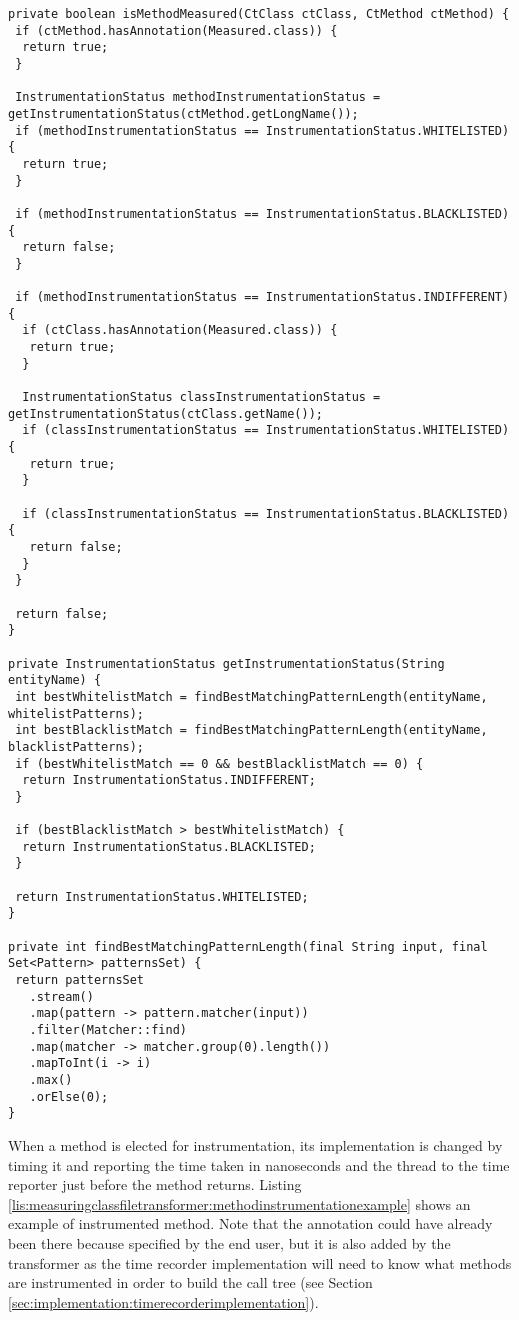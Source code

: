 \begin{lstlisting}[breaklines,caption={$MeasuringClassFileTransformer.isMethodMeasured$ implementation},label=lis:measuringclassfiletransformer:ismethodmeasured]
private boolean isMethodMeasured(CtClass ctClass, CtMethod ctMethod) {
 if (ctMethod.hasAnnotation(Measured.class)) {
  return true;
 }

 InstrumentationStatus methodInstrumentationStatus = getInstrumentationStatus(ctMethod.getLongName());
 if (methodInstrumentationStatus == InstrumentationStatus.WHITELISTED) {
  return true;
 }

 if (methodInstrumentationStatus == InstrumentationStatus.BLACKLISTED) {
  return false;
 }

 if (methodInstrumentationStatus == InstrumentationStatus.INDIFFERENT) {
  if (ctClass.hasAnnotation(Measured.class)) {
   return true;
  }

  InstrumentationStatus classInstrumentationStatus = getInstrumentationStatus(ctClass.getName());
  if (classInstrumentationStatus == InstrumentationStatus.WHITELISTED) {
   return true;
  }

  if (classInstrumentationStatus == InstrumentationStatus.BLACKLISTED) {
   return false;
  }
 }
    
 return false;
}

private InstrumentationStatus getInstrumentationStatus(String entityName) {
 int bestWhitelistMatch = findBestMatchingPatternLength(entityName, whitelistPatterns);
 int bestBlacklistMatch = findBestMatchingPatternLength(entityName, blacklistPatterns);
 if (bestWhitelistMatch == 0 && bestBlacklistMatch == 0) {
  return InstrumentationStatus.INDIFFERENT;
 }

 if (bestBlacklistMatch > bestWhitelistMatch) {
  return InstrumentationStatus.BLACKLISTED;
 }

 return InstrumentationStatus.WHITELISTED;
}

private int findBestMatchingPatternLength(final String input, final Set<Pattern> patternsSet) {
 return patternsSet
   .stream()
   .map(pattern -> pattern.matcher(input))
   .filter(Matcher::find)
   .map(matcher -> matcher.group(0).length())
   .mapToInt(i -> i)
   .max()
   .orElse(0);
}
\end{lstlisting}

\noindent When a method is elected for instrumentation, its implementation is changed by timing it and reporting the time taken in nanoseconds and the thread  to the time reporter just before the method returns. Listing \ref{lis:measuringclassfiletransformer:methodinstrumentationexample} shows an example of instrumented method. Note that the  annotation could have already been there because specified by the end user, but it is also added by the transformer as the time recorder implementation will need to know what methods are instrumented in order to build the call tree (see Section \ref{sec:implementation:timerecorderimplementation}).

